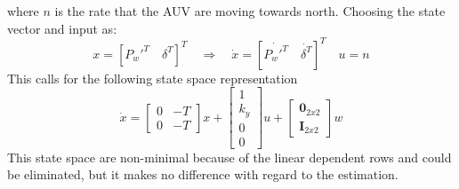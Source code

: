 	where $n$ is the rate that the AUV are moving towards north.
	Choosing the state vector and input as:
	\begin{equation}
		x = [ P_w'^T \quad \delta^T]^T \quad \Rightarrow  \quad \dot{x} = [\dot{P_w'^T} \quad
		\dot{\delta^T}]^T \quad  u = n
	\end{equation}
	This calls for the following state space representation 
	\begin{equation}
		\dot{x} = \left [ \begin{array}{cc}
					0 & -T \\
					0 & -T
				\end{array} \right] x + \left [ \begin{array}{c}
								1 \\
								k_y\\
								0 \\
								0
								\end{array} \right] u +
				\left [ \begin{array}{c}
						\mathbf{0}_{2x2} \\
						\mathbf{I}_{2x2} 
					\end{array} \right] w
	\end{equation}
	This state space are non-minimal because of the linear dependent rows and could be eliminated, but it makes no
	difference with regard to the estimation.

